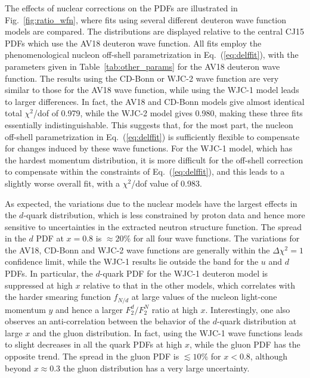 \documentclass[aps,prd,amsmath,preprint]{revtex4}
\begin{document}
The effects of nuclear corrections on the PDFs are illustrated in
Fig.~\ref{fig:ratio_wfn}, where fits using several different deuteron
wave function models are compared.  The distributions are displayed
relative to the central CJ15 PDFs which use the AV18 deuteron wave
function.  All fits employ the phenomenological nucleon off-shell
parametrization in Eq.~(\ref{eq:delffit}), with the parameters given
in Table~\ref{tab:other_params} for the AV18 deuteron wave function.
%
The results using the CD-Bonn or WJC-2 wave function are very
similar to those for the AV18 wave function, while using the WJC-1
model leads to larger differences.  In fact, the AV18 and CD-Bonn
models give almost identical total $\chi^2$/dof of 0.979, while
the WJC-2 model gives 0.980, making these three fits essentially
indistinguishable.  This suggests that, for the most part, the
nucleon off-shell parametrization in Eq.~(\ref{eq:delffit}) is
sufficiently flexible to compensate for changes induced by these
wave functions.  For the WJC-1 model, which has the hardest momentum
distribution, it is more difficult for the off-shell correction to
compensate within the constraints of Eq.~(\ref{eq:delffit}), and
this leads to a slightly worse overall fit, with a $\chi^2$/dof
value of 0.983.


As expected, the variations due to the nuclear models have the
largest effects in the $d$-quark distribution, which is less
constrained by proton data and hence more sensitive to uncertainties
in the extracted neutron structure function.  The spread in the
$d$ PDF at $x=0.8$ is $\approx 20\%$ for all four wave functions.
The variations for the AV18, CD-Bonn and WJC-2 wave functions are
generally within the $\Delta\chi^2=1$ confidence limit, while the
WJC-1 results lie outside the band for the $u$ and $d$ PDFs.
In particular, the $d$-quark PDF for the WJC-1 deuteron model
is suppressed at high $x$ relative to that in the other models,
which correlates with the harder smearing function $f_{N/d}$
at large values of the nucleon light-cone momentum $y$ and
hence a larger $F_2^d/F_2^N$ ratio at high $x$.
%
Interestingly, one also observes an anti-correlation between the
behavior of the $d$-quark distribution at large $x$ and the gluon
distribution.  In fact, using the WJC-1 wave functions leads to
slight decreases in all the quark PDFs at high $x$, while the
gluon PDF has the opposite trend.  The spread in the gluon PDF
is $\lesssim 10\%$ for $x<0.8$, although beyond $x \approx 0.3$
the gluon distribution has a very large uncertainty.
\end{document}
